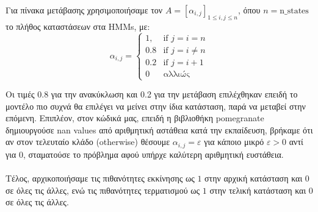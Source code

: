

\noindent Για πίνακα μετάβασης χρησιμοποιήσαμε τον $A = [α_{i, j}]_{1 \le i, j \le n}$, όπου $n = \text{n\_states}$ το πλήθος καταστάσεων στα HMMs, με:
$$α_{i, j} = 
\begin{cases}
	1, & \text{if $j = i = n$}\\
	0.8 & \text{if $j = i \neq n$}\\
	0.2 & \text{if $j = i+1$}\\
	0 & \text{αλλιώς}
\end{cases}
$$

\noindent Οι τιμές 0.8 για την ανακύκλωση και 0.2 για την μετάβαση επιλέχθηκαν επειδή το μοντέλο πιο συχνά θα επιλέγει να μείνει στην ίδια κατάσταση, παρά να μεταβεί στην επόμενη. Επιπλέον, στον κώδικά μας, επειδή η βιβλιοθήκη pomegranate δημιουργούσε nan values από αριθμητική αστάθεια κατά την εκπαίδευση, βρήκαμε ότι αν στον τελευταίο κλάδο (otherwise) θέσουμε $α_{i, j} = ε$ για κάποιο μικρό $ε > 0$ αντί για $0$, σταματούσε το πρόβλημα αφού υπήρχε καλύτερη αριθμητική ευστάθεια.\\
\\
\noindent Τέλος, αρχικοποιήσαμε τις πιθανότητες εκκίνησης ως $1$ στην αρχική κατάσταση και $0$ σε όλες τις άλλες, ενώ τις πιθανότητες τερματισμού ως $1$ στην τελική κατάσταση και $0$ σε όλες τις άλλες.

